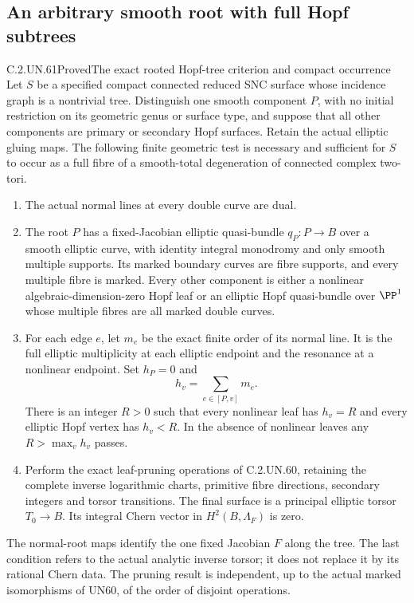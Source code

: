 \subsection{An arbitrary smooth root with full Hopf subtrees}

\begin{statement}{C.2.UN.61}{Proved}{The exact rooted Hopf-tree criterion and compact occurrence}
Let $S$ be a specified compact connected reduced SNC surface whose
incidence graph is a nontrivial tree. Distinguish one smooth component
$P$, with no initial restriction on its geometric genus or surface
type, and suppose that all other components are primary or secondary
Hopf surfaces. Retain the actual elliptic gluing maps. The following
finite geometric test is necessary and sufficient for $S$ to occur
as a full fibre of a smooth-total degeneration of connected complex
two-tori.

\begin{enumerate}
\item The actual normal lines at every double curve are dual.
\item The root $P$ has a fixed-Jacobian elliptic quasi-bundle
$q_P:P\to B$ over a smooth elliptic curve, with identity integral
monodromy and only smooth multiple supports. Its marked boundary
curves are fibre supports, and every multiple fibre is marked.
Every other component is either a nonlinear algebraic-dimension-zero
Hopf leaf or an elliptic Hopf quasi-bundle over $\PP^1$ whose
multiple fibres are all marked double curves.
\item For each edge $e$, let $m_e$ be the exact finite order of
its normal line. It is the full elliptic multiplicity at each
elliptic endpoint and the resonance at a nonlinear endpoint.
Set $h_P=0$ and
\[
                  h_v=\sum_{e\in[P,v]}m_e.
                  \tag{C.PT.1}
\]
There is an integer $R>0$ such that every nonlinear leaf has
$h_v=R$ and every elliptic Hopf vertex has $h_v<R$.
In the absence of nonlinear leaves any $R>\max_vh_v$ passes.
\item Perform the exact leaf-pruning operations of C.2.UN.60,
retaining the complete inverse logarithmic charts, primitive fibre
directions, secondary integers and torsor transitions. The final
surface is a principal elliptic torsor $T_0\to B$. Its integral
Chern vector in $H^2(B,\Lambda_F)$ is zero.
\end{enumerate}

The normal-root maps identify the one fixed Jacobian $F$ along
the tree. The last condition refers to the actual analytic
inverse torsor; it does not replace it by its rational Chern
data. The pruning result is independent, up to the actual
marked isomorphisms of UN60, of the order of disjoint operations.


\end{statement}
